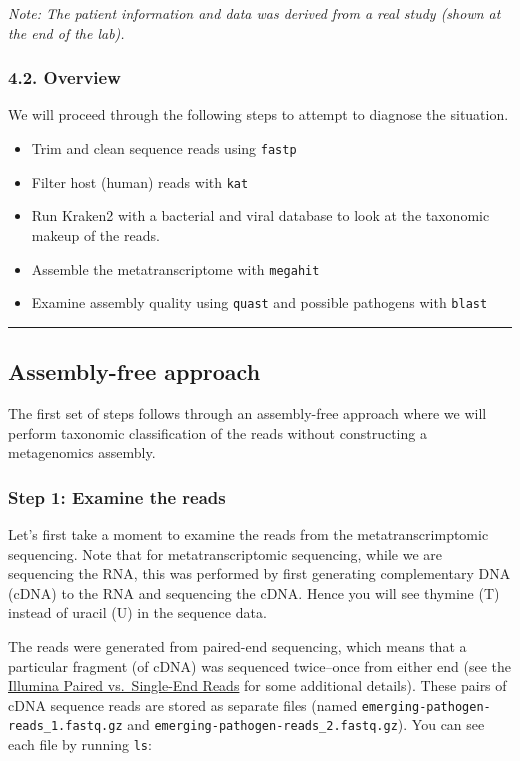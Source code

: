 \documentclass[
]{book}
\providecommand{\tightlist}{%
  \setlength{\itemsep}{0pt}\setlength{\parskip}{0pt}}
\begin{document}
\emph{Note: The patient information and data was derived from a real study (shown at the end of the lab).}

\subsubsection{4.2. Overview}\label{exercise-overview}

We will proceed through the following steps to attempt to diagnose the situation.

\begin{itemize}
\tightlist
\item
  Trim and clean sequence reads using \texttt{fastp}
\item
  Filter host (human) reads with \texttt{kat}
\item
  Run Kraken2 with a bacterial and viral database to look at the taxonomic makeup of the reads.
\item
  Assemble the metatranscriptome with \texttt{megahit}
\item
  Examine assembly quality using \texttt{quast} and possible pathogens with \texttt{blast}
\end{itemize}

\begin{center}\rule{0.5\linewidth}{0.5pt}\end{center}

\subsection{Assembly-free approach}\label{assembly-free}

The first set of steps follows through an assembly-free approach where we will perform taxonomic classification of the reads without constructing a metagenomics assembly.

\subsubsection{Step 1: Examine the reads}\label{exercise-examine-reads}

Let's first take a moment to examine the reads from the metatranscrimptomic sequencing. Note that for metatranscriptomic sequencing, while we are sequencing the RNA, this was performed by first generating complementary DNA (cDNA) to the RNA and sequencing the cDNA. Hence you will see thymine (T) instead of uracil (U) in the sequence data.

The reads were generated from paired-end sequencing, which means that a particular fragment (of cDNA) was sequenced twice--once from either end (see the \href{https://www.illumina.com/science/technology/next-generation-sequencing/plan-experiments/paired-end-vs-single-read.html}{Illumina Paired vs.~Single-End Reads} for some additional details). These pairs of cDNA sequence reads are stored as separate files (named \texttt{emerging-pathogen-reads\_1.fastq.gz} and \texttt{emerging-pathogen-reads\_2.fastq.gz}). You can see each file by running \texttt{ls}:
\end{document}
